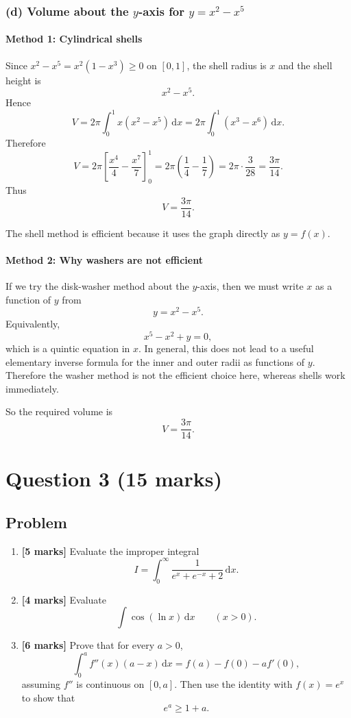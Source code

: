 \documentclass[12pt]{article}
\newcommand{\dd}{\,\mathrm{d}}
\begin{document}
\bigskip

\subsubsection{(d) Volume about the \(y\)-axis for \(y=x^2-x^5\)}

\paragraph{Method 1: Cylindrical shells}
Since \(x^2-x^5=x^2(1-x^3)\ge 0\) on \([0,1]\), the shell radius is \(x\) and the shell height is
\[
x^2-x^5.
\]
Hence
\[
V
=
2\pi\int_0^1 x(x^2-x^5)\dd x
=
2\pi\int_0^1 (x^3-x^6)\dd x.
\]
Therefore
\[
V
=
2\pi\left[\frac{x^4}{4}-\frac{x^7}{7}\right]_0^1
=
2\pi\left(\frac14-\frac17\right)
=
2\pi\cdot\frac{3}{28}
=
\frac{3\pi}{14}.
\]
Thus
\[
\boxed{V=\frac{3\pi}{14}.}
\]

The shell method is efficient because it uses the graph directly as \(y=f(x)\).

\paragraph{Method 2: Why washers are not efficient}
If we try the disk-washer method about the \(y\)-axis, then we must write \(x\) as a function of \(y\) from
\[
y=x^2-x^5.
\]
Equivalently,
\[
x^5-x^2+y=0,
\]
which is a quintic equation in \(x\). In general, this does not lead to a useful elementary inverse formula for the inner and outer radii as functions of \(y\). Therefore the washer method is not the efficient choice here, whereas shells work immediately.

So the required volume is
\[
\boxed{V=\frac{3\pi}{14}.}
\]

\newpage

\section{Question 3 \hfill (15 marks)}

\subsection{Problem}

\begin{enumerate}[label=(\alph*)]
\item \textbf{[5 marks]} Evaluate the improper integral
\[
I=\int_0^\infty \frac{1}{e^x+e^{-x}+2}\dd x.
\]

\item \textbf{[4 marks]} Evaluate
\[
\int \cos(\ln x)\dd x
\qquad (x>0).
\]

\item \textbf{[6 marks]} Prove that for every \(a>0\),
\[
\int_0^a f''(x)(a-x)\dd x=f(a)-f(0)-af'(0),
\]
assuming \(f''\) is continuous on \([0,a]\). Then use the identity with \(f(x)=e^x\) to show that
\[
e^a\ge 1+a.
\]
\end{enumerate}
\end{document}
